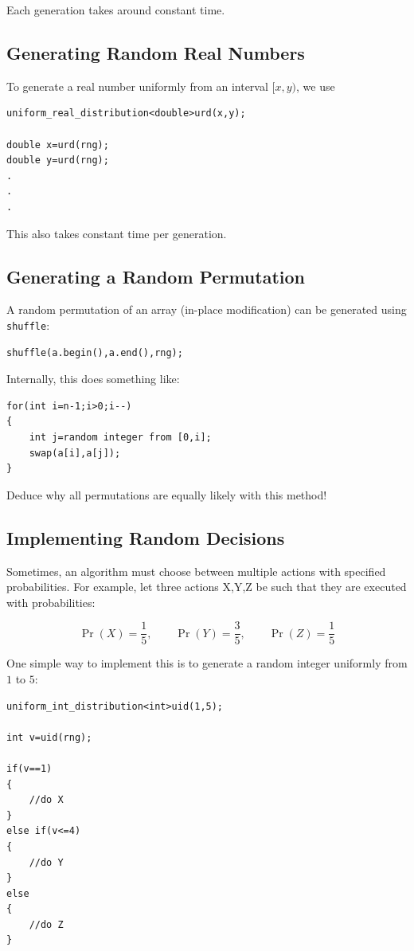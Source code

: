 \documentclass[11pt,openany]{book}
\begin{document}
\noindent Each generation takes around constant time.

\subsection*{Generating Random Real Numbers}

To generate a real number uniformly from an interval \([x,y)\), we use

\begin{verbatim}
uniform_real_distribution<double>urd(x,y);

double x=urd(rng);
double y=urd(rng);
.
.
.
\end{verbatim}

\noindent This also takes constant time per generation.

\subsection*{Generating a Random Permutation}

A random permutation of an array (in-place modification) can be generated using \texttt{shuffle}:

\begin{verbatim}
shuffle(a.begin(),a.end(),rng);
\end{verbatim}

\noindent Internally, this does something like:

\begin{verbatim}
for(int i=n-1;i>0;i--)
{
    int j=random integer from [0,i];
    swap(a[i],a[j]);
}
\end{verbatim}

\noindent Deduce why all permutations are equally likely with this method!

\subsection*{Implementing Random Decisions}

Sometimes, an algorithm must choose between multiple actions with specified probabilities. For example, let three actions X,Y,Z be such that they are executed with probabilities:

\[
\Pr(X)=\frac{1}{5},
\qquad
\Pr(Y)=\frac{3}{5},
\qquad
\Pr(Z)=\frac{1}{5}
\]

\noindent One simple way to implement this is to generate a random integer uniformly from \(1\) to \(5\):

\begin{verbatim}
uniform_int_distribution<int>uid(1,5);

int v=uid(rng);

if(v==1)
{
    //do X
}
else if(v<=4)
{
    //do Y
}
else
{
    //do Z
}
\end{verbatim}
\end{document}
